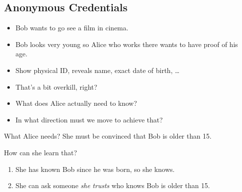 \documentclass{beamer}
\begin{document}
\subsection{Anonymous Credentials}

\begin{frame}
  \begin{example}
    \begin{itemize}
      \item Bob wants to go see a film in cinema.
      \item Bob looks very young so Alice who works there wants to have proof 
        of his age.

        \pause{}

      \item Show physical ID, reveals name, exact date of birth, \dots
    \end{itemize}
  \end{example}

  \pause{}

  \begin{exercise}
    \begin{itemize}
      \item That's a bit overkill, right?
      \item What does Alice actually need to know?
      \item In what direction must we move to achieve that?
    \end{itemize}
  \end{exercise}
\end{frame}

\begin{frame}
  \begin{block}{What Alice needs?}
    She must be convinced that Bob is older than 15.
  \end{block}

  \pause{}

  \begin{alertblock}{How can she learn that?}
    \begin{enumerate}
      \item She has known Bob since he was born, so she knows.

        \pause{}

      \item She can ask someone \emph{she trusts} who knows Bob is older than 
        15.
    \end{enumerate}
  \end{alertblock}
\end{frame}
\end{document}
